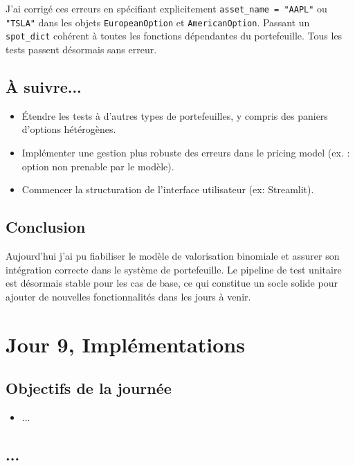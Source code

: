 \documentclass[a4paper,11pt]{article}
\begin{document}
J'ai corrigé ces erreurs en spécifiant explicitement \texttt{asset\_name = "AAPL"} ou \texttt{"TSLA"} dans les objets \texttt{EuropeanOption} et \texttt{AmericanOption}. Passant un \texttt{spot\_dict} cohérent à toutes les fonctions dépendantes du portefeuille. Tous les tests passent désormais sans erreur.

\subsection{À suivre...}
\begin{itemize}
    \item Étendre les tests à d’autres types de portefeuilles, y compris des paniers d’options hétérogènes.
    \item Implémenter une gestion plus robuste des erreurs dans le pricing model (ex. : option non prenable par le modèle).
    \item Commencer la structuration de l’interface utilisateur (ex: Streamlit).
\end{itemize}

\subsection{Conclusion}

Aujourd'hui j'ai pu fiabiliser le modèle de valorisation binomiale et assurer son intégration correcte dans le système de portefeuille. Le pipeline de test unitaire est désormais stable pour les cas de base, ce qui constitue un socle solide pour ajouter de nouvelles fonctionnalités dans les jours à venir.

\newpage


\section{Jour 9, Implémentations}
\subsection{Objectifs de la journée}
\begin{itemize}
    \item ...
\end{itemize}
\subsection{...}
\end{document}
